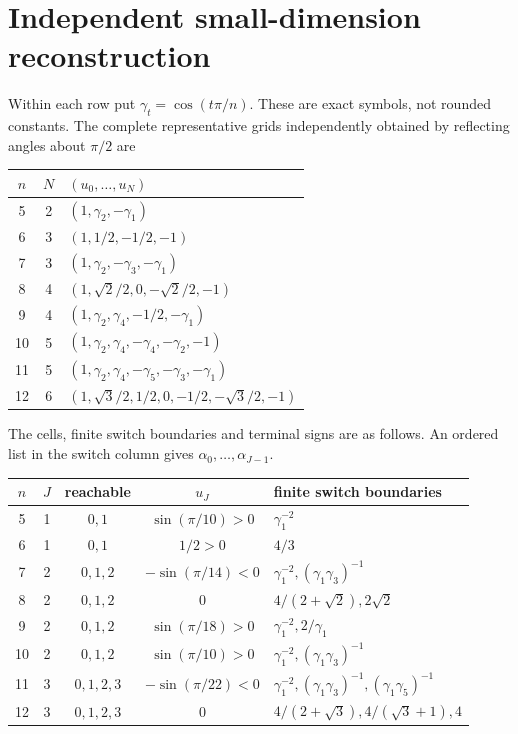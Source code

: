 \documentclass[11pt]{article}
\begin{document}
\section{Independent small-dimension reconstruction}
Within each row put $\gamma_t=\cos(t\pi/n)$. These are exact symbols,
not rounded constants. The complete representative grids independently
obtained by reflecting angles about $\pi/2$ are
\begin{center}\small
\begin{tabular}{@{}c c l@{}}
\toprule $n$&$N$&$(u_0,\ldots,u_N)$\\\midrule
5&2&$(1,\gamma_2,-\gamma_1)$\\
6&3&$(1,1/2,-1/2,-1)$\\
7&3&$(1,\gamma_2,-\gamma_3,-\gamma_1)$\\
8&4&$(1,\sqrt2/2,0,-\sqrt2/2,-1)$\\
9&4&$(1,\gamma_2,\gamma_4,-1/2,-\gamma_1)$\\
10&5&$(1,\gamma_2,\gamma_4,-\gamma_4,-\gamma_2,-1)$\\
11&5&$(1,\gamma_2,\gamma_4,-\gamma_5,-\gamma_3,-\gamma_1)$\\
12&6&$(1,\sqrt3/2,1/2,0,-1/2,-\sqrt3/2,-1)$\\\bottomrule
\end{tabular}\end{center}
The cells, finite switch boundaries and terminal signs are as follows.
An ordered list in the switch column gives $\alpha_0,\ldots,\alpha_{J-1}$.
\begin{center}\small
\begin{tabular}{@{}c c c c l@{}}
\toprule
$n$&$J$&reachable&$u_J$&finite switch boundaries\\\midrule
5&1&$0,1$&$\sin(\pi/10)>0$&$\gamma_1^{-2}$\\
6&1&$0,1$&$1/2>0$&$4/3$\\
7&2&$0,1,2$&$-\sin(\pi/14)<0$&$\gamma_1^{-2},(\gamma_1\gamma_3)^{-1}$\\
8&2&$0,1,2$&$0$&$4/(2+\sqrt2),2\sqrt2$\\
9&2&$0,1,2$&$\sin(\pi/18)>0$&$\gamma_1^{-2},2/\gamma_1$\\
10&2&$0,1,2$&$\sin(\pi/10)>0$&$\gamma_1^{-2},(\gamma_1\gamma_3)^{-1}$\\
11&3&$0,1,2,3$&$-\sin(\pi/22)<0$&$\gamma_1^{-2},(\gamma_1\gamma_3)^{-1},(\gamma_1\gamma_5)^{-1}$\\
12&3&$0,1,2,3$&$0$&$4/(2+\sqrt3),4/(\sqrt3+1),4$\\\bottomrule
\end{tabular}\end{center}
\end{document}
